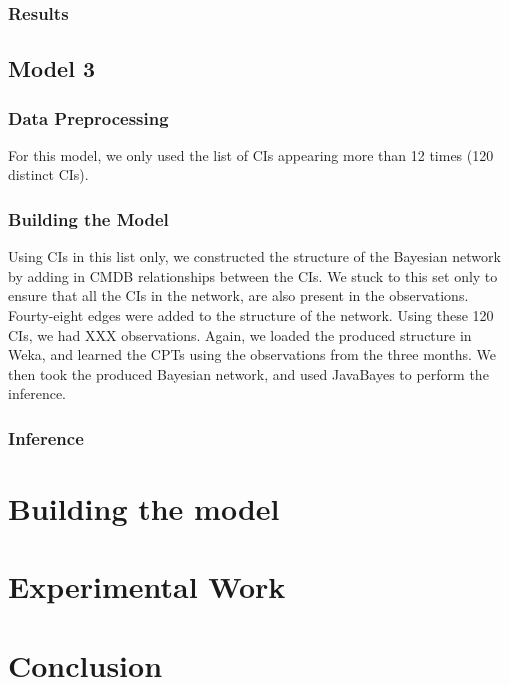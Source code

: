 \documentclass{article}
\begin{document}
\subsubsection*{Results}


\subsection{Model 3}

\subsubsection*{Data Preprocessing}

For this model, we only used the list of CIs appearing more than 12 times (120 distinct CIs). 

\subsubsection*{Building the Model}

Using CIs in this list only, we constructed the structure of the Bayesian network by adding in CMDB relationships between the CIs. We stuck to this set only to
ensure that all the CIs in the network, are also present in the observations. Fourty-eight edges were added to the structure of the network. Using these 120
CIs, we had XXX observations. Again, we loaded the produced structure in Weka, and learned the CPTs using the observations from the three months. We then took
the produced Bayesian network, and used JavaBayes to perform the inference.

\subsubsection*{Inference}



\section{Building the model}
\label{sec:model}

\section{Experimental Work}
\label{sec:exp}

\section{Conclusion}
\label{concl}




\end{document}
